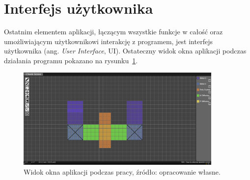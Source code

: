 \section{Interfejs użytkownika}
\label{sec:interfejs_uzytkownika}

Ostatnim elementem aplikacji,
łączącym wszystkie funkcje w całość oraz umożliwiającym użytkownikowi interakcję z programem,
jest interfejs użytkownika (ang. \textit{User Interface}, UI).
Ostateczny widok okna aplikacji podczas działania programu pokazano na rysunku~\ref{fig:ui_final}.

\begin{figure}[H]
    \centering
    \includegraphics[width=0.9\textwidth]{chapters/chapter4/rys/final_ui}
    \caption[Widok okna aplikacji podczas pracy.]
    {Widok okna aplikacji podczas pracy, źródło: opracowanie własne.}
    \label{fig:ui_final}
\end{figure}

